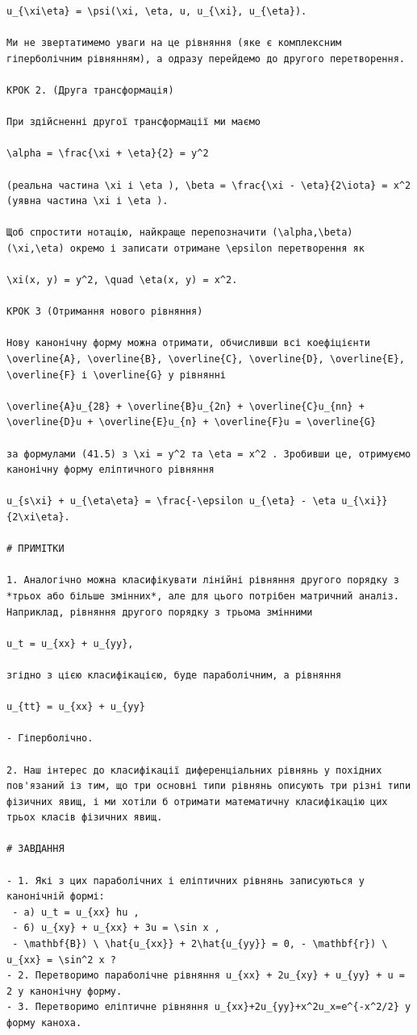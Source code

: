 \documentclass[
  ukrainian,
]{article}
\begin{document}
\begin{verbatim}
u_{\xi\eta} = \psi(\xi, \eta, u, u_{\xi}, u_{\eta}).

Ми не звертатимемо уваги на це рівняння (яке є комплексним гіперболічним рівнянням), а одразу перейдемо до другого перетворення.

КРОК 2. (Друга трансформація)

При здійсненні другої трансформації ми маємо

\alpha = \frac{\xi + \eta}{2} = y^2

(реальна частина \xi і \eta ), \beta = \frac{\xi - \eta}{2\iota} = x^2 (уявна частина \xi і \eta ).

Щоб спростити нотацію, найкраще перепозначити (\alpha,\beta) (\xi,\eta) окремо і записати отримане \epsilon перетворення як

\xi(x, y) = y^2, \quad \eta(x, y) = x^2.

КРОК 3 (Отримання нового рівняння)

Нову канонічну форму можна отримати, обчисливши всі коефіцієнти \overline{A}, \overline{B}, \overline{C}, \overline{D}, \overline{E}, \overline{F} і \overline{G} у рівнянні

\overline{A}u_{28} + \overline{B}u_{2n} + \overline{C}u_{nn} + \overline{D}u + \overline{E}u_{n} + \overline{F}u = \overline{G}

за формулами (41.5) з \xi = y^2 та \eta = x^2 . Зробивши це, отримуємо канонічну форму еліптичного рівняння

u_{s\xi} + u_{\eta\eta} = \frac{-\epsilon u_{\eta} - \eta u_{\xi}}{2\xi\eta}.

# ПРИМІТКИ

1. Аналогічно можна класифікувати лінійні рівняння другого порядку з *трьох або більше змінних*, але для цього потрібен матричний аналіз. Наприклад, рівняння другого порядку з трьома змінними

u_t = u_{xx} + u_{yy},

згідно з цією класифікацією, буде параболічним, а рівняння

u_{tt} = u_{xx} + u_{yy}

- Гіперболічно.

2. Наш інтерес до класифікації диференціальних рівнянь у похідних пов'язаний із тим, що три основні типи рівнянь описують три різні типи фізичних явищ, і ми хотіли б отримати математичну класифікацію цих трьох класів фізичних явищ.

# ЗАВДАННЯ

- 1. Які з цих параболічних і еліптичних рівнянь записуються у канонічній формі:
 - a) u_t = u_{xx} hu ,
 - 6) u_{xy} + u_{xx} + 3u = \sin x ,
 - \mathbf{B}) \ \hat{u_{xx}} + 2\hat{u_{yy}} = 0, - \mathbf{r}) \ u_{xx} = \sin^2 x ?
- 2. Перетворимо параболічне рівняння u_{xx} + 2u_{xy} + u_{yy} + u = 2 у канонічну форму.
- 3. Перетворимо еліптичне рівняння u_{xx}+2u_{yy}+x^2u_x=e^{-x^2/2} у форму каноха.


\end{verbatim}
\end{document}
